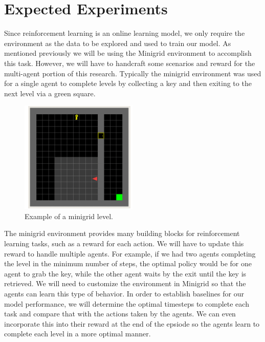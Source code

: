 \documentclass[11pt]{article}
\begin{document}
\section{Expected Experiments}

Since reinforcement learning is an online learning model, we only require the environment as the data to be explored and used to train our model. As mentioned previously we will be using the Minigrid environment to accomplish this task. However, we will have to handcraft some scenarios and reward for the multi-agent portion of this research. Typically the minigrid environment was used for a single agent to complete levels by collecting a key and then exiting to the next level via a green square. 

  
\begin{figure}[!h]
  \centering
  \includegraphics[width=\linewidth]{figs/minigridenv.png}
  \caption{Example of a minigrid level.}
  \label{fig:minigrid}
\end{figure}

The minigrid environment provides many building blocks for reinforcement learning tasks, such as a reward for each action. We will have to update this reward to handle multiple agents. For example, if we had two agents completing the level in the minimum number of steps, the optimal policy would be for one agent to grab the key, while the other agent waits by the exit until the key is retrieved. We will need to customize the environment in Minigrid so that the agents can learn this type of behavior. In order to establish baselines for our model performance, we will determine the optimal timesteps to complete each task and compare that with the actions taken by the agents. We can even incorporate this into their reward at the end of the epsiode so the agents learn to complete each level in a more optimal manner.
\end{document}
